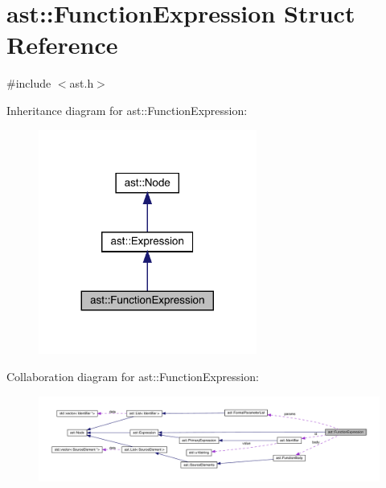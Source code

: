 \hypertarget{structast_1_1_function_expression}{}\section{ast\+:\+:Function\+Expression Struct Reference}
\label{structast_1_1_function_expression}


{\ttfamily \#include $<$ast.\+h$>$}



Inheritance diagram for ast\+:\+:Function\+Expression\+:\nopagebreak
\begin{figure}[H]
\begin{center}
\leavevmode
\includegraphics[width=203pt]{structast_1_1_function_expression__inherit__graph}
\end{center}
\end{figure}


Collaboration diagram for ast\+:\+:Function\+Expression\+:\nopagebreak
\begin{figure}[H]
\begin{center}
\leavevmode
\includegraphics[width=350pt]{structast_1_1_function_expression__coll__graph}
\end{center}
\end{figure}
